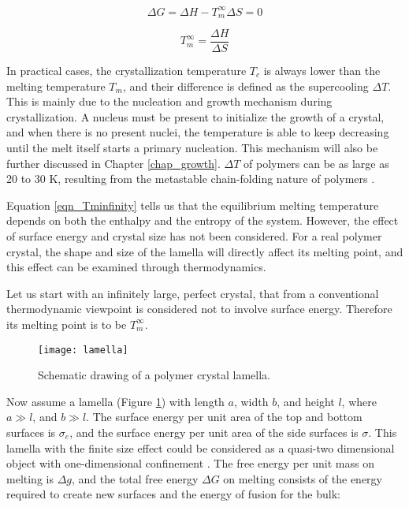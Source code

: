 \begin{equation}
\label{eqn_deltaG}
\Delta G = \Delta H - T_{m}^{\infty} \Delta S = 0
\end{equation}

\begin{equation}
\label{eqn_Tminfinity}
T_{m}^{\infty} = \dfrac{\Delta H}{\Delta S}
\end{equation}

In practical cases, the crystallization temperature $T_{c}$ is always lower than the melting temperature $T_{m}$, and their difference is defined as the supercooling $\Delta T$. This is mainly due to the nucleation and growth mechanism during crystallization. A nucleus must be present to initialize the growth of a crystal, and when there is no present nuclei, the temperature is able to keep decreasing until the melt itself starts a primary nucleation. This mechanism will also be further discussed in Chapter \ref{chap_growth}. $\Delta T$ of polymers can be as large as 20 to 30 K, resulting from the metastable chain-folding nature of polymers \cite{Hu2013}.

Equation \ref{eqn_Tminfinity} tells us that the equilibrium melting temperature depends on both the enthalpy and the entropy of the system. However, the effect of surface energy and crystal size has not been considered. For a real polymer crystal, the shape and size of the lamella will directly affect its melting point, and this effect can be examined through thermodynamics.

Let us start with an infinitely large, perfect crystal, that from a conventional thermodynamic viewpoint is considered not to involve surface energy. Therefore its melting point is to be $T_{m}^{\infty}$.

\begin{figure}[H]
	\center
	\texttt{[image: lamella]}
	\caption{Schematic drawing of a polymer crystal lamella.}
	\label{fig:lamella}
\end{figure}

Now assume a lamella (Figure \ref{fig:lamella}) with length $a$, width $b$, and height $l$, where $a \gg l$, and $b \gg l$. The surface energy per unit area of the top and bottom surfaces is $\sigma_{e}$, and the surface energy per unit area of the side surfaces is $\sigma$. This lamella with the finite size effect could be considered as a quasi-two dimensional object with one-dimensional confinement \cite{Zhang2016a}. The free energy per unit mass on melting is $\Delta g$, and the total free energy $\Delta G$ on melting consists of the energy required to create new surfaces and the energy of fusion for the bulk:

